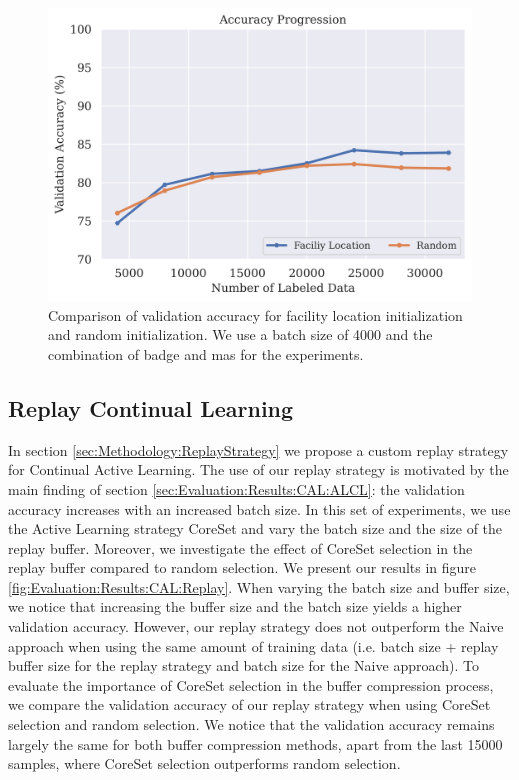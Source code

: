 \begin{figure}[h]
    \centering
    \includegraphics[width=0.7\linewidth]{images/results_CAL/Facility_location_init.png}
    \caption[Initialization using Facility Location]{Comparison of validation accuracy for facility location initialization and random initialization. We use a batch size of 4000 and the combination of \gls{badge} and \gls{mas} for the experiments.}
    \label{fig:Evaluation:Results:CAL:FLinit}
\end{figure}


\subsection{Replay Continual Learning}
\label{sec:Evaluation:Results:CAL:Replay}
In section \ref{sec:Methodology:ReplayStrategy} we propose a custom replay strategy for Continual Active Learning. The use of our replay strategy is motivated by the main finding of section \ref{sec:Evaluation:Results:CAL:ALCL}: the validation accuracy increases with an
increased batch size. In this set of experiments, we use the Active Learning strategy CoreSet and vary the batch size and the size of the replay buffer. Moreover, we investigate the effect of CoreSet selection in the replay buffer compared to random selection. We present our
results in figure \ref{fig:Evaluation:Results:CAL:Replay}. When varying the batch size and buffer size, we notice that increasing the buffer size and the batch size yields a higher validation accuracy. However, our replay strategy does not outperform the Naive approach when using
the same amount of training data (i.e. batch size + replay buffer size for the replay strategy and batch size for the Naive approach). To evaluate the importance of CoreSet selection in the buffer compression process, we compare the validation accuracy of our replay strategy
when using CoreSet selection and random selection. We notice that the validation accuracy remains largely the same for both buffer compression methods, apart from the last 15000 samples, where CoreSet selection outperforms random selection. \par

